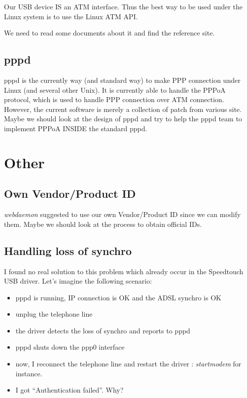 \documentclass[a4paper,12pt]{article}
\begin{document}
Our USB device IS an ATM interface. Thus the best way to be used under
the Linux system is to use the Linux ATM API.

We need to read some documents about it and find the reference site.

\subsection{pppd}

pppd is the currently way (and standard way) to make PPP connection
under Linux (and several other Unix). It is currently able to handle
the PPPoA protocol, which is used to handle PPP connection over ATM
connection. However, the current software is merely a collection of
patch from various site. Maybe we should look at the design of pppd
and try to help the pppd team to implement PPPoA INSIDE the standard
pppd.

\section{Other}

\subsection{Own Vendor/Product ID}

\textit{webdaemon} suggested to use our own Vendor/Product ID since we
can modify them. Maybe we should look at the process to obtain
official IDs.

\subsection{Handling loss of synchro}

I found no real solution to this problem which already occur in the
Speedtouch USB driver. Let's imagine the following scenario:

\begin{itemize}

\item pppd is running, IP connection is OK and the ADSL synchro is OK
\item unplug the telephone line
\item the driver detects the loss of synchro and reports to pppd
\item pppd shuts down the ppp0 interface
\item now, I reconnect the telephone line and restart the driver : \textit{startmodem} for instance.
\item I got ``Authentication failed''. Why?
\end{itemize}
\end{document}
